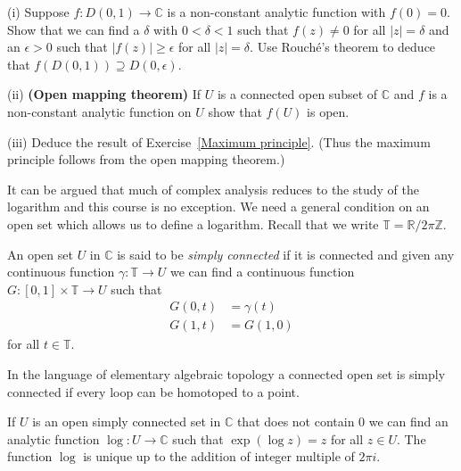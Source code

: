 \begin{exercise}\label{Open mapping theorem}
(i) Suppose $f:D(0,1)\rightarrow{\mathbb C}$ is
a non-constant analytic function with $f(0)=0$.
Show that we can find a $\delta$ with $0<\delta<1$
such that $f(z)\neq 0$ for all $|z|=\delta$ and
an $\epsilon>0$ such that $|f(z)|\geq\epsilon$ for all
$|z|=\delta$. Use Rouch\'{e}'s theorem to deduce
that $f(D(0,1))\supseteq D(0,\epsilon)$.

(ii) {\bf (Open mapping theorem)}
If $U$ is a connected open subset of ${\mathbb C}$
and $f$ is a non-constant analytic function on $U$ show
that $f(U)$ is open.

(iii) Deduce the result of Exercise~\ref{Maximum principle}.
(Thus the maximum principle follows from the open
mapping theorem.)
\end{exercise}

It can be argued that much of complex analysis reduces
to the study of the logarithm and this course is no
exception. We need a general condition on an open set
which allows us to define a logarithm. Recall
that we write ${\mathbb T}={\mathbb R}/2\pi{\mathbb Z}$.
\begin{definition} An open set $U$ in ${\mathbb C}$
is said to be \emph{simply connected} if it is connected
and given any continuous function 
$\gamma:{\mathbb T}\rightarrow U$ we can find
a continuous function 
$G:[0,1]\times{\mathbb T}\rightarrow U$
such that 
\begin{align*}
G(0,t)&=\gamma(t)\\
G(1,t)&=G(1,0)
\end{align*}
for all $t\in {\mathbb T}$.
\end{definition}
In the language of elementary algebraic topology 
a connected open set is simply connected if every
loop can be homotoped to a point.
\begin{theorem}\label{logarithm} 
If $U$ is an open simply connected
set in ${\mathbb C}$ that does not contain $0$
we can find an analytic function $\log:U\rightarrow{\mathbb C}$
such that $\exp(\log z)=z$ for all $z\in U$. The
function $\log$ is unique up to the addition of
integer multiple of $2\pi i$.
\end{theorem} 


